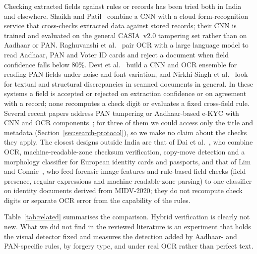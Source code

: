 \documentclass[conference]{IEEEtran}
\begin{document}
Checking extracted fields against rules or records has been tried both
in India and elsewhere. Shaikh and Patil~\cite{shaikh} combine a CNN
with a cloud form-recognition service that cross-checks extracted data
against stored records; their CNN is trained and evaluated on the
general CASIA~v2.0 tampering set rather than on Aadhaar or PAN.
Raghuvanshi et al.~\cite{raghuvanshi} pair OCR with a large language
model to read Aadhaar, PAN and Voter ID cards and reject a document when
field confidence falls below 80\%. Devi et al.~\cite{panens} build a
CNN and OCR ensemble for reading PAN fields under noise and font
variation, and Nirkhi Singh et al.~\cite{nirkhi} look for textual and
structural discrepancies in scanned documents in general. In these
systems a field is accepted or rejected on extraction confidence or on
agreement with a record; none recomputes a check digit or evaluates a
fixed cross-field rule. Several recent papers address PAN
tampering or Aadhaar-based e-KYC with CNN and OCR
components~\cite{lalsudhesh,arora,hamza,muralikrishna}; for three of
them we could access only the title and metadata
(Section~\ref{sec:search-protocol}), so we make no claim about the
checks they apply. The closest designs outside India are that of Dai
et al.~\cite{dai}, who combine OCR, machine-readable-zone checksum
verification, copy-move detection and a morphology classifier for
European identity cards and passports, and that of Lim and
Connie~\cite{limconnie}, who feed forensic image features and
rule-based field checks (field presence, regular expressions and
machine-readable-zone parsing) to one classifier on identity documents
derived from MIDV-2020; they do not recompute check digits or separate
OCR error from the capability of the rules.

Table~\ref{tab:related} summarises the comparison. Hybrid verification
is clearly not new. What we did not find in the reviewed literature is
an experiment that holds the visual detector fixed and measures the
detection added by Aadhaar- and PAN-specific rules, by forgery type, and
under real OCR rather than perfect text.
\end{document}

